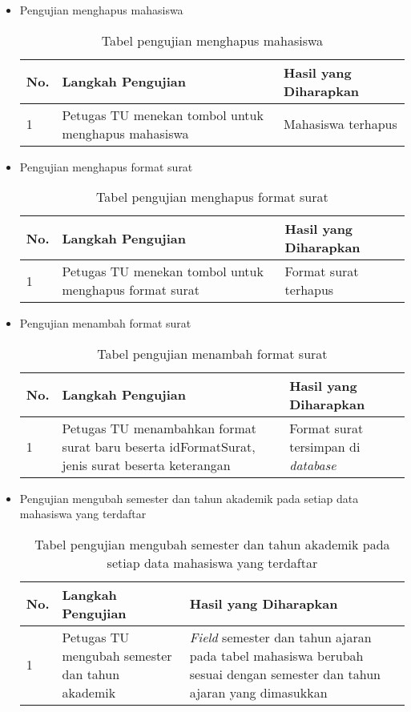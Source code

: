 \begin{itemize}
	\item Pengujian menghapus mahasiswa
	\begin{table}[H]
	\centering
	\caption{Tabel pengujian menghapus mahasiswa}
	\label{pengujian_menghapus_mahasiswa}
	\begin{tabular}{|l|p{6cm}|p{6cm}|}
	\hline
	\textbf{No.}&\textbf{Langkah Pengujian}&\textbf{Hasil yang Diharapkan}\\ \hline
	1&Petugas TU menekan tombol untuk menghapus mahasiswa&Mahasiswa terhapus \\ \hline
	\end{tabular}
	\end{table}
	
	\item Pengujian menghapus format surat
	\begin{table}[H]
	\centering
	\caption{Tabel pengujian menghapus format surat}
	\label{pengujian_menghapus_format_surat}
	\begin{tabular}{|l|p{6cm}|p{6cm}|}
	\hline
	\textbf{No.}&\textbf{Langkah Pengujian}&\textbf{Hasil yang Diharapkan}\\ \hline
	1&Petugas TU menekan tombol untuk menghapus format surat&Format surat terhapus\\ \hline
	\end{tabular}
	\end{table}
	
	\item Pengujian menambah format surat
	\begin{table}[H]
	\centering
	\caption{Tabel pengujian menambah format surat}
	\label{pengujian_menambah_format_surat}
	\begin{tabular}{|l|p{6cm}|p{6cm}|}
	\hline
	\textbf{No.}&\textbf{Langkah Pengujian}&\textbf{Hasil yang Diharapkan}\\ \hline
	1&Petugas TU menambahkan format surat baru beserta idFormatSurat, jenis surat beserta keterangan&Format surat tersimpan di \textit{database}\\ \hline
	\end{tabular}
	\end{table}
	
	\item Pengujian mengubah semester dan tahun akademik pada setiap data mahasiswa yang terdaftar
	\begin{table}[H]
	\centering
	\caption{Tabel pengujian mengubah semester dan tahun akademik pada setiap data mahasiswa yang terdaftar}
	\label{pengujian_mengubah_semester_dan_tahun_akademik}
	\begin{tabular}{|l|p{6cm}|p{6cm}|}
	\hline
	\textbf{No.}&\textbf{Langkah Pengujian}&\textbf{Hasil yang Diharapkan}\\ \hline
	1&Petugas TU mengubah semester dan tahun akademik&\textit{Field} semester dan tahun ajaran pada tabel mahasiswa berubah sesuai dengan semester dan tahun ajaran yang dimasukkan\\ \hline
	\end{tabular}
	\end{table}
	
\end{itemize}